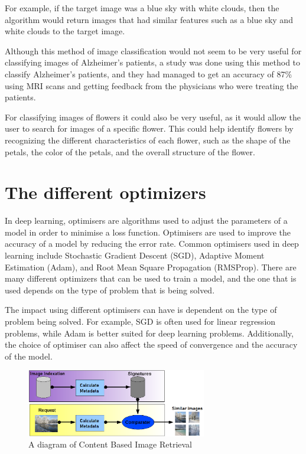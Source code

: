 \documentclass[]{final_report}
\begin{document}
For example, if the target image was a blue sky with white clouds, then the algorithm would return 
images that had similar features such as a blue sky and white clouds to the target image.

Although this method of image classification would not seem to be very useful for classifying images of Alzheimer's patients, 
a study was done using this method to classify Alzheimer's patients, and they had managed to get an accuracy of 87\% using MRI scans\cite{5972513}
and getting feedback from the physicians who were treating the patients.

For classifying images of flowers it could also be very useful, as it would allow the user to search for images of a specific flower.
This could help identify flowers by recognizing the different characteristics of each flower, such as the shape of the petals, 
the color of the petals, and the overall structure of the flower.

\section{The different optimizers}

In deep learning, optimisers are algorithms used to adjust the parameters of a model in order to minimise a loss function. 
Optimisers are used to improve the accuracy of a model by reducing the error rate. 
Common optimisers used in deep learning include Stochastic Gradient Descent (SGD),
Adaptive Moment Estimation (Adam), and Root Mean Square Propagation (RMSProp).
There are many different optimizers that can be used to train a model, and the one 
that is used depends on the type of problem that is being solved.

The impact using different optimisers can have is dependent on the type of problem being solved. 
For example, SGD is often used for linear regression problems, while Adam is 
better suited for deep learning problems. 
Additionally, the choice of optimiser can also affect the speed of convergence and the accuracy of the model.

\begin{figure}[h]
  \centering
  \includegraphics[width=0.7\textwidth]{images/Principe_cbir.png}
  \caption{A diagram of Content Based Image Retrieval \cite{ContentBasedImageRetrieval}}
\end{figure}
\end{document}
